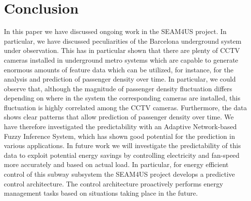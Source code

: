 \section{Conclusion}
\label{sec:conclusion}

In this paper we have discussed ongoing work in the SEAM4US project. 
In particular, we have discussed peculiarities of the Barcelona underground system under observation.
This has in particular shown that there are plenty of CCTV cameras installed in underground metro systems which are capable to generate enormous amounts of feature data which can be utilized, for instance, for the analysis and prediction of passenger density over time.
In particular, we could observe that, although the magnitude of passenger density fluctuation differs depending on where in the system the corresponding cameras are installed, this fluctuation is highly correlated among the CCTV cameras.
Furthermore, the data shows clear patterns that allow prediction of passenger density over time. 
We have therefore investigated the predictability with an Adaptive Network-based Fuzzy Inference System, which has shown good potential for the prediction in various applications. 
In future work we will investigate the predictability of this data to exploit potential energy savings by controlling electricity and fan-speed more accurately and based on actual load.  
In particular, for energy efficient control of this subway subsystem the SEAM4US project develops a predictive control architecture. 
The control architecture proactively performs energy management tasks based on situations taking place in the future. 
